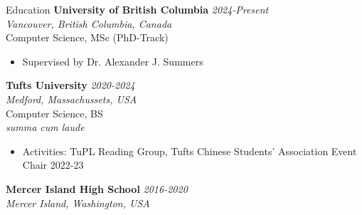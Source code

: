 \documentclass{resume} %
\begin{document}

\begin{rSection}{Education}
{\bf University of British Columbia} \hfill {\em 2024-Present}
\\ {\it Vancouver, British Columbia, Canada}
\\ Computer Science, MSc (PhD-Track)
\begin{itemize}
    \item Supervised by Dr. Alexander J. Summers
\end{itemize}
{\bf Tufts University} \hfill {\em 2020-2024}
\\ {\it Medford, Massachussets, USA}
\\ Computer Science, BS
\\ \textit{summa cum laude}
\begin{itemize}
    \item Activities: TuPL Reading Group, Tufts Chinese Students' Association Event Chair 2022-23
\end{itemize}
{\bf Mercer Island High School} \hfill {\em 2016-2020} 
\\ {\it Mercer Island, Washington, USA}

\end{rSection}
\end{document}
